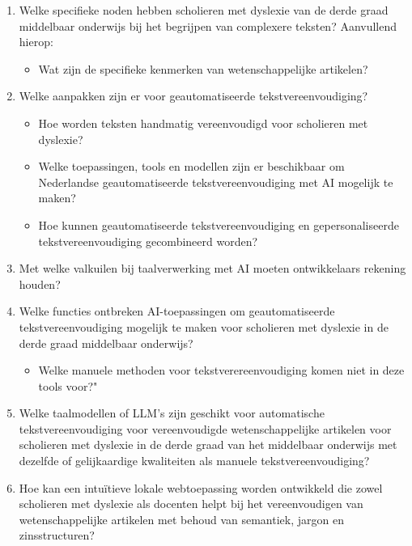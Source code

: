 \begin{enumerate}
	\item Welke specifieke noden hebben scholieren met dyslexie van de derde graad middelbaar onderwijs bij het begrijpen van complexere teksten? Aanvullend hierop: 
	\begin{itemize}
		\item Wat zijn de specifieke kenmerken van wetenschappelijke artikelen?
	\end{itemize} 
	\item Welke aanpakken zijn er voor geautomatiseerde tekstvereenvoudiging?
	\begin{itemize}
		\item Hoe worden teksten handmatig vereenvoudigd voor scholieren met dyslexie?
		\item Welke toepassingen, tools en modellen zijn er beschikbaar om Nederlandse geautomatiseerde tekstvereenvoudiging met AI mogelijk te maken?
		\item Hoe kunnen geautomatiseerde tekstvereenvoudiging en gepersonaliseerde tekstvereenvoudiging gecombineerd worden?
	\end{itemize}
	\item Met welke valkuilen bij taalverwerking met AI moeten ontwikkelaars rekening houden?
	\item Welke functies ontbreken AI-toepassingen om geautomatiseerde tekstvereenvoudiging mogelijk te maken voor scholieren met dyslexie in de derde graad middelbaar onderwijs? 
	\begin{itemize}
		\item Welke manuele methoden voor tekstverereenvoudiging komen niet in deze tools voor?"
	\end{itemize}
	\item Welke taalmodellen of LLM's zijn geschikt voor automatische tekstvereenvoudiging voor vereenvoudigde wetenschappelijke artikelen voor scholieren met dyslexie in de derde graad van het middelbaar onderwijs met dezelfde of gelijkaardige kwaliteiten als manuele tekstvereenvoudiging?
	\item Hoe kan een intuïtieve lokale webtoepassing worden ontwikkeld die zowel scholieren met dyslexie als docenten helpt bij het vereenvoudigen van wetenschappelijke artikelen met behoud van semantiek, jargon en zinsstructuren?
\end{enumerate}


\section{}%
\label{sec:onderzoeksdoelstelling}

